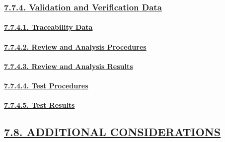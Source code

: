 \documentclass[
]{article}
\begin{document}
\hypertarget{validation-and-verification-data}{%
\subsubsection{\texorpdfstring{\protect\hyperlink{validation-and-verification-data-1}{7.7.4.
Validation and Verification
Data}}{7.7.4. Validation and Verification Data}}\label{validation-and-verification-data}}

\hypertarget{traceability-data}{%
\paragraph{\texorpdfstring{\protect\hyperlink{traceability-data-1}{7.7.4.1.
Traceability
Data}}{7.7.4.1. Traceability Data}}\label{traceability-data}}

\hypertarget{review-and-analysis-procedures}{%
\paragraph{\texorpdfstring{\protect\hyperlink{review-and-analysis-procedures-1}{7.7.4.2.
Review and Analysis
Procedures}}{7.7.4.2. Review and Analysis Procedures}}\label{review-and-analysis-procedures}}

\hypertarget{review-and-analysis-results}{%
\paragraph{\texorpdfstring{\protect\hyperlink{review-and-analysis-results-1}{7.7.4.3.
Review and Analysis
Results}}{7.7.4.3. Review and Analysis Results}}\label{review-and-analysis-results}}

\hypertarget{test-procedures}{%
\paragraph{\texorpdfstring{\protect\hyperlink{test-procedures-1}{7.7.4.4.
Test Procedures}}{7.7.4.4. Test Procedures}}\label{test-procedures}}

\hypertarget{test-results}{%
\paragraph{\texorpdfstring{\protect\hyperlink{test-results-1}{7.7.4.5.
Test Results}}{7.7.4.5. Test Results}}\label{test-results}}

\hypertarget{additional-considerations}{%
\subsection{\texorpdfstring{\protect\hyperlink{additional-considerations-1}{7.8.
ADDITIONAL
CONSIDERATIONS}}{7.8. ADDITIONAL CONSIDERATIONS}}\label{additional-considerations}}
\end{document}
